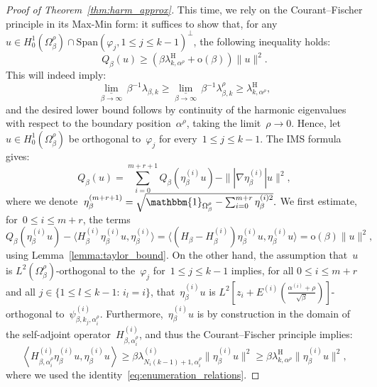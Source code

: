 \documentclass[10pt]{article}
\newcommand{\1}{\mathbbm 1}
\newcommand{\epsLimit}[1]{\alpha^{(#1)}} %
\newcommand{\halfSpace}[1]{E^{(#1)}}
\newcommand{\shift}{\rho} %
\renewcommand{\o}{\mathrm{o}}
\begin{document}
\begin{proof}[Proof of Theorem~\ref{thm:harm_approx}]
        This time, we rely on the Courant--Fischer principle in its Max-Min form: it suffices to show that, for any~$u \in H_0^1(\Omega_\beta^\shift)\cap\mathrm{Span}(\varphi_j, 1\leq j \leq k-1)^\perp$, the following inequality holds:
       ~$$ Q_\beta(u) \geq (\beta\lambda_{k,\alpha^\shift}^{\mathrm{H}} + \o(\beta))\|u\|^2.$$
        This will indeed imply:
        \[\underset{\beta\to\infty}{\underline\lim}\,\beta^{-1}\lambda_{\beta,k}\geq\underset{\beta\to\infty}{\underline\lim}\,\beta^{-1}\lambda^\shift_{\beta,k}\geq \lambda_{k,\alpha^\shift}^{\mathrm{H}},\]
        and the desired lower bound follows by continuity of the harmonic eigenvalues with respect to the boundary position~$\alpha^\shift$, taking the limit~$\shift\to 0$.
        Hence, let~$u\in H_0^1(\Omega_\beta^\shift)$ be orthogonal to~$\varphi_j$ for every~$1\leq j \leq k-1$. The IMS formula gives:
        \[Q_\beta(u) = \sum_{i=0}^{m+r+1} Q_\beta(\eta_\beta^{(i)}u) - \||\nabla \eta_\beta^{(i)}|u\|^2,\]
        where we denote~$\eta_\beta^{(m+r+1)} = \sqrt{\mathbbm{1}_{\Omega_\beta^\shift}-\sum_{i=0}^{m+r}\eta_\beta^{(i)2}}.$
        We first estimate, for~$0\leq i \leq m+r$, the terms
        \begin{equation}
            Q_\beta(\eta_\beta^{(i)}u)-\langle H_\beta^{(i)}\eta_\beta^{(i)}u,\eta_\beta^{(i)}\rangle = \langle (H_\beta-H_\beta^{(i)})\eta_\beta^{(i)}u,\eta_\beta^{(i)}u\rangle = \mathrm o(\beta)\|u\|^2,
        \end{equation}
        using Lemma~\ref{lemma:taylor_bound}.
        On the other hand, the assumption that~$u$ is $L^2(\Omega_\beta^\shift)$-orthogonal to the~$\varphi_j$ for~$1\leq j \leq k-1$ implies, for all $0\leq i\leq m+r$ and all $j \in \{1\leq l\leq k-1:\,i_l =i \}$, that~$\eta_\beta^{(i)}u$ is $L^2\left[z_{i} + \halfSpace{i}\left(\frac{\epsLimit{i}+\shift}{\sqrt\beta}\right)\right]$-orthogonal to~$\psi_{\beta,k_j,\alpha_{i}^\shift}^{(i)}$.
        Furthermore,~$\eta_\beta^{(i)}u$ is by construction in the domain of the self-adjoint operator~$H_{\beta,\alpha^\shift_{i}}^{(i)}$, and thus the Courant--Fischer principle implies:
        \begin{equation}
            \left\langle H_{\beta,\alpha^\shift_{i}}^{(i)}\eta_\beta^{(i)}u,\eta_\beta^{(i)}u\right\rangle \geq \beta\lambda_{N_i(k-1)+1,\alpha^\shift_{i}}^{(i)}\|\eta_\beta^{(i)}u\|^2\geq \beta \lambda_{k,\alpha^\shift}^{\mathrm H}\|\eta_\beta^{(i)}u\|^2,
        \end{equation}
        where we used the identity~\eqref{eq:enumeration_relations}.


\end{proof}
\end{document}
